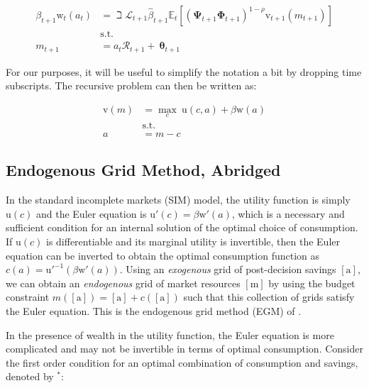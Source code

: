 \documentclass{article}
\newcommand{\DiscFac}{\beta}
\newcommand{\uFunc}{\mathrm{u}}
\newcommand{\vFunc}{\mathrm{v}}
\newcommand{\Alive}{\mathcal{L}}
\newcommand{\Ex}{\mathbb{E}}
\newcommand{\CRRA}{\rho}
\newcommand{\PermGroFac}{\pmb{\Phi}}
\newcommand{\PermShk}{\mathbf{\Psi}}
\newcommand{\aNrm}{a}
\newcommand{\cNrm}{c}
\newcommand{\RNrm}{\mathcal{R}}
\newcommand{\TranShkEmp}{\pmb{\theta}}
\newcommand{\mNrm}{m}
\newcommand{\wFunc}{\mathrm{w}}
\newcommand{\aRat}{a}
\newcommand{\mRat}{m}
\newcommand{\aMat}{[\mathrm{a}]}
\newcommand{\mMat}{[\mathrm{m}]}
\begin{document}
\begin{equation}
\begin{align}
    \DiscFac_{t+1} \wFunc_{t}(\aNrm_{t}) & = \beth\Alive_{t+1}\hat{\DiscFac}_{t+1}
    \Ex_{t}[(\PermShk_{t+1}\PermGroFac_{t+1})^{1-\CRRA}{\vFunc}_{t+1}({m}_{t+1})]
    \\ & \text{s.t.}
    \\ {m}_{t+1} & = \aNrm_{t}\RNrm_{t+1}+ ~\TranShkEmp_{t+1}
\end{align}
\end{equation}

For our purposes, it will be useful to simplify the notation a bit by dropping time subscripts. The recursive problem can then be written as:

\begin{equation}
\begin{align}
    \vFunc(\mRat) & = \max_{\cNrm} ~ \uFunc(\cNrm, \aNrm) + \DiscFac \wFunc(\aRat)
    \\ & \text{s.t.}
    \\ \aNrm & = \mRat-\cNrm
\end{align}
\end{equation}

\subsection{Endogenous Grid Method, Abridged}\label{Endogenous Grid Method, Abridged}

In the standard incomplete markets (SIM) model, the utility function is simply $\uFunc(\cNrm)$ and the Euler equation is $\uFunc'(\cNrm) = \DiscFac \wFunc'(\aNrm)$, which is a necessary and sufficient condition for an internal solution of the optimal choice of consumption. If $\uFunc(\cNrm)$ is differentiable and its marginal utility is invertible, then the Euler equation can be inverted to obtain the optimal consumption function as $\cNrm(\aNrm) = \uFunc'^{ -1}(\DiscFac \wFunc'(\aNrm))$. Using an \textit{exogenous} grid of post-decision savings $\aMat$, we can obtain an \textit{endogenous} grid of market resources $\mMat$ by using the budget constraint $\mNrm(\aMat) = \aMat + \cNrm(\aMat)$ such that this collection of grids satisfy the Euler equation. This is the endogenous grid method (EGM) of \cite{Carroll_2006}.

In the presence of wealth in the utility function, the Euler equation is more complicated and may not be invertible in terms of optimal consumption. Consider the first order condition for an optimal combination of consumption and savings, denoted by $^*$:
\end{document}
